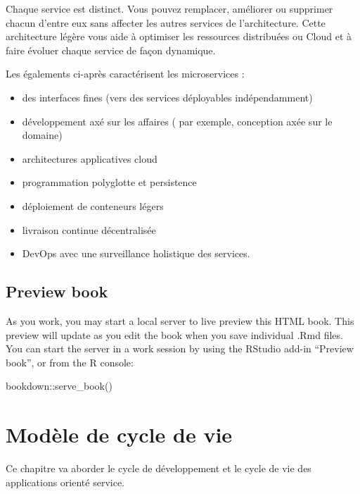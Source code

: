 \documentclass[
]{book}
\newenvironment{Shaded}{\begin{snugshade}}{\end{snugshade}}
\newcommand{\FunctionTok}[1]{\textcolor[rgb]{0.00,0.00,0.00}{#1}}
\newcommand{\NormalTok}[1]{#1}
\newcommand{\SpecialCharTok}[1]{\textcolor[rgb]{0.00,0.00,0.00}{#1}}
\theoremstyle{definition}
\theoremstyle{definition}
\theoremstyle{definition}
\theoremstyle{definition}
\theoremstyle{remark}
\begin{document}
Chaque service est distinct. Vous pouvez remplacer, améliorer ou supprimer chacun d'entre eux sans affecter les autres services de l'architecture. Cette architecture légère vous aide à optimiser les ressources distribuées ou Cloud et à faire évoluer chaque service de façon dynamique.

Les égalements ci-après caractérisent les microservices :

\begin{itemize}
\item
  des interfaces fines (vers des services déployables indépendamment)
\item
  développement axé sur les affaires ( par exemple, conception axée sur le domaine)
\item
  architectures applicatives cloud
\item
  programmation polyglotte et persistence
\item
  déploiement de conteneurs légers
\item
  livraison continue décentralisée
\item
  DevOps avec une surveillance holistique des services.
\end{itemize}

\hypertarget{preview-book}{%
\section{Preview book}\label{preview-book}}

As you work, you may start a local server to live preview this HTML book. This preview will update as you edit the book when you save individual .Rmd files. You can start the server in a work session by using the RStudio add-in ``Preview book'', or from the R console:

\begin{Shaded}
\begin{Highlighting}[]
\NormalTok{bookdown}\SpecialCharTok{::}\FunctionTok{serve\_book}\NormalTok{()}
\end{Highlighting}
\end{Shaded}

\hypertarget{moduxe8le-de-cycle-de-vie}{%
\chapter{Modèle de cycle de vie}\label{moduxe8le-de-cycle-de-vie}}

Ce chapitre va aborder le cycle de développement et le cycle de vie des applications orienté service.
\end{document}
